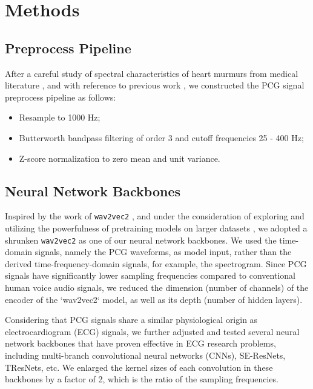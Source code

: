 \section{Methods}
\label{sec:methods}

\subsection{Preprocess Pipeline}
\label{subsec:preproc}

After a careful study of spectral characteristics of heart murmurs from medical literature \cite{Donnerstein_1989, Noponen_2007}, and with reference to previous work \cite{Schmidt_2010}, we constructed the PCG signal preprocess pipeline as follows:
\begin{itemize}
    \item Resample to 1000 Hz;
    \item Butterworth bandpass filtering of order 3 and cutoff frequencies 25 - 400 Hz;
    \item Z-score normalization to zero mean and unit variance.
\end{itemize}

\subsection{Neural Network Backbones}
\label{subsec:backbone}

Inspired by the work of \texttt{wav2vec2} \cite{baevski2020wav2vec}, and under the consideration of exploring and utilizing the powerfulness of pretraining models on larger datasets \cite{wolf-etal-2020-transformers}, we adopted a shrunken \texttt{wav2vec2} as one of our neural network backbones. We used the time-domain signals, namely the PCG waveforms, as model input, rather than the derived time-frequency-domain signals, for example, the spectrogram. Since PCG signals have significantly lower sampling frequencies compared to conventional human voice audio signals, we reduced the dimension (number of channels) of the encoder of the `wav2vec2` model, as well as its depth (number of hidden layers). 

Considering that PCG signals share a similar physiological origin as electrocardiogram (ECG) signals, we further adjusted and tested several neural network backbones \cite{Kang_2022_cinc2021_iop} that have proven effective in ECG research problems, including multi-branch convolutional neural networks (CNNs), SE-ResNets, TResNets, etc. We enlarged the kernel sizes of each convolution in these backbones by a factor of 2, which is the ratio of the sampling frequencies.

